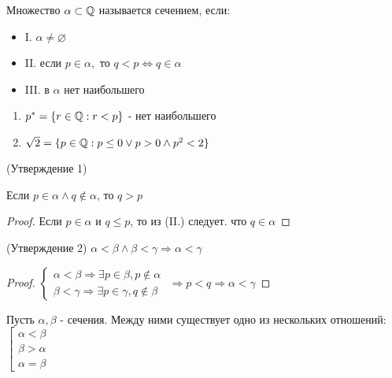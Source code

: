 \begin{definition}
    
    Множество $\alpha \subset \mathbb{Q}$ называется сечением, если:
    \begin{itemize}
        \item I. $\alpha \neq \varnothing$
        \item II. если $p \in \alpha, $ то $q < p \Leftrightarrow q \in \alpha$
        \item III. в $\alpha$ нет наибольшего
    \end{itemize}
\end{definition}

\begin{eg}
    \begin{enumerate}
        \item $p^* = \{r \in \mathbb{Q}: r < p\}$ - нет наибольшего
        \item $\sqrt{2} = \{p \in \mathbb{Q}: p \leq 0 \lor p > 0 \land p^2 < 2\}$ 
    \end{enumerate}
\end{eg}

\begin{theorem} (Утверждение 1)
    
    Если $p \in \alpha \land q \notin \alpha$, то $ q > p$
\end{theorem}

\begin{proof}
    Если $p \in \alpha$ и $q \leq p$, то из (II.) следует. что $q \in \alpha$
\end{proof}

\begin{theorem} (Утверждение 2)
    $\alpha < \beta \land \beta < \gamma \Rightarrow \alpha < \gamma$
\end{theorem}

\begin{proof}
    $\begin{cases}
        \alpha < \beta \Rightarrow \exists p \in \beta, p \notin \alpha \\
        \beta < \gamma \Rightarrow \exists p \in \gamma, q \notin \beta
    \end{cases}$
    $\Rightarrow p < q \Rightarrow \alpha < \gamma$
\end{proof}

\begin{theorem}
    Пусть $\alpha, \beta$ - сечения. Между ними существует одно из нескольких отношений:
    $\left[ 
        \begin{gathered} 
        \alpha < \beta \\ 
        \beta > \alpha \\
        \alpha = \beta 
        \end{gathered} 
    \right.$
\end{theorem}

